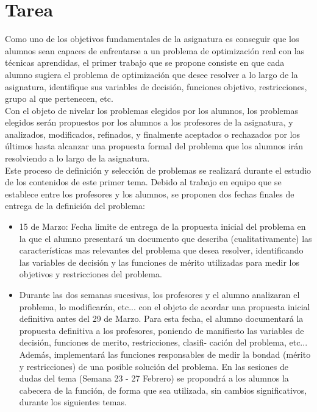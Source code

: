 \section*{Tarea}
Como uno de los objetivos fundamentales de la asignatura es conseguir que los
alumnos sean capaces de enfrentarse a un problema de optimización real con 
las técnicas aprendidas, el primer trabajo que se propone consiste en que 
cada alumno sugiera el problema de optimización que desee resolver a lo largo
de la asignatura, identifique sus variables de decisión, funciones objetivo,
restricciones, grupo al que pertenecen, etc. \\

Con el objeto de nivelar los problemas elegidos por los alumnos, 
los problemas elegidos serán propuestos por los alumnos a los
profesores de la asignatura, y analizados, modificados, refinados,
y finalmente aceptados o rechazados por los últimos hasta
alcanzar una propuesta formal del problema que los alumnos irán resolviendo
a lo largo de la asignatura. \\

Este proceso de definición y selección de problemas se realizará durante el estudio de los contenidos de este primer tema.
Debido al trabajo en equipo que se establece entre los profesores y los alumnos, se proponen dos fechas finales de entrega de
la definición del problema:

\begin{itemize}
    \item 15 de Marzo: Fecha limite de entrega de la propuesta inicial del problema en la que el alumno presentará un documento que
describa (cualitativamente) las características mas relevantes del problema que desea resolver, identificando las variables de
decisión y las funciones de mérito utilizadas para medir los objetivos y restricciones del problema.

    \item Durante las dos semanas sucesivas, los profesores y el alumno analizaran el problema, lo modificarán, etc... con el objeto
de acordar una propuesta inicial definitiva antes del 29 de Marzo. Para esta fecha, el alumno documentará la propuesta
definitiva a los profesores, poniendo de manifiesto las variables de decisión, funciones de merito, restricciones, clasifi-
cación del problema, etc... Además, implementará las funciones responsables de medir la bondad (mérito y restricciones)
de una posible solución del problema. En las sesiones de dudas del tema (Semana 23 - 27 Febrero) se propondrá a
los alumnos la cabecera de la función, de forma que sea utilizada, sin cambios significativos, durante los siguientes temas.
\end{itemize}